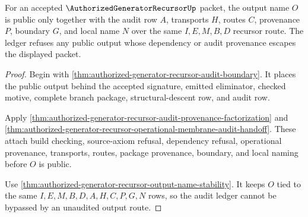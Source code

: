 \begin{theorem}
\label{thm:authorized-generator-recursor-output-audit-ledger}
For an accepted $\AuthorizedGeneratorRecursorUp$ packet, the output name $O$ is
public only together with the audit row $A$, transports $H$, routes $C$,
provenance $P$, boundary $G$, and local name $N$ over the same
$I,E,M,B,D$ recursor route. The ledger refuses any public output whose
dependency or audit provenance escapes the displayed packet.
\end{theorem}
\begin{proof}
Begin with \autoref{thm:authorized-generator-recursor-audit-boundary}. It
places the public output behind the accepted signature, emitted eliminator,
checked motive, complete branch package, structural-descent row, and audit row.

Apply \autoref{thm:authorized-generator-recursor-audit-provenance-factorization}
and \autoref{thm:authorized-generator-recursor-operational-membrane-audit-handoff}.
These attach build checking, source-axiom refusal, dependency refusal,
operational provenance, transports, routes, package provenance, boundary, and
local naming before $O$ is public.

Use \autoref{thm:authorized-generator-recursor-output-name-stability}. It keeps
$O$ tied to the same $I,E,M,B,D,A,H,C,P,G,N$ rows, so the audit ledger cannot
be bypassed by an unaudited output route.
\end{proof}

